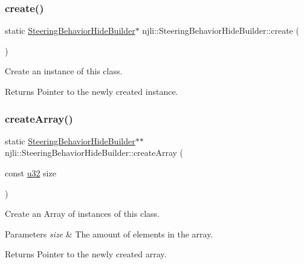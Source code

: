 \subsubsection{\texorpdfstring{create()}{create()}}
{\footnotesize\ttfamily static \mbox{\hyperlink{classnjli_1_1_steering_behavior_hide_builder}{Steering\+Behavior\+Hide\+Builder}}$\ast$ njli\+::\+Steering\+Behavior\+Hide\+Builder\+::create (\begin{DoxyParamCaption}{ }\end{DoxyParamCaption})\hspace{0.3cm}{\ttfamily [static]}}

Create an instance of this class.

\begin{DoxyReturn}{Returns}
Pointer to the newly created instance. 
\end{DoxyReturn}
\mbox{\label{classnjli_1_1_steering_behavior_hide_builder_a4d39b1c0a0217217ab35f8d12c476595}} 
\subsubsection{\texorpdfstring{create\+Array()}{createArray()}}
{\footnotesize\ttfamily static \mbox{\hyperlink{classnjli_1_1_steering_behavior_hide_builder}{Steering\+Behavior\+Hide\+Builder}}$\ast$$\ast$ njli\+::\+Steering\+Behavior\+Hide\+Builder\+::create\+Array (\begin{DoxyParamCaption}\item[{const \mbox{\hyperlink{_util_8h_a10e94b422ef0c20dcdec20d31a1f5049}{u32}}}]{size }\end{DoxyParamCaption})\hspace{0.3cm}{\ttfamily [static]}}

Create an Array of instances of this class.


\begin{DoxyParams}{Parameters}
{\em size} & The amount of elements in the array.\\
\hline
\end{DoxyParams}
\begin{DoxyReturn}{Returns}
Pointer to the newly created array. 
\end{DoxyReturn}
\mbox{\label{classnjli_1_1_steering_behavior_hide_builder_a09a39860185eaed59b62223ff8fc7393}} 
